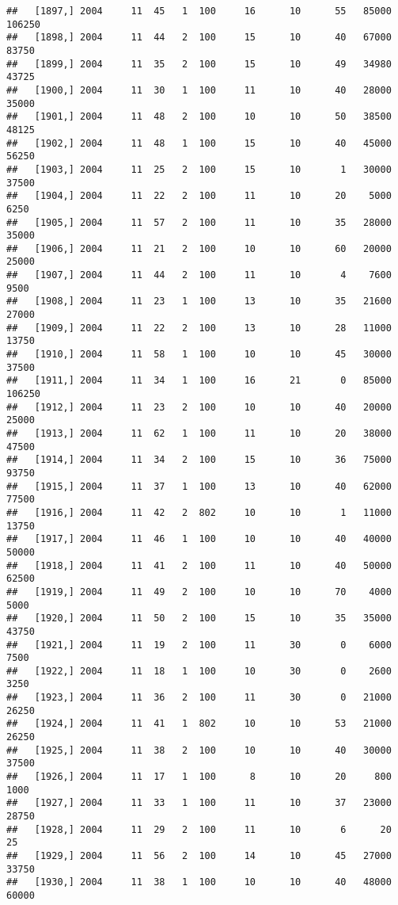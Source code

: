 \documentclass{article}\usepackage[]{graphicx}\usepackage[]{color}
\makeatletter
\newenvironment{kframe}{%
 \def\at@end@of@kframe{}%
 \ifinner\ifhmode%
  \def\at@end@of@kframe{\end{minipage}}%
  \begin{minipage}{\columnwidth}%
 \fi\fi%
 \def\FrameCommand##1{\hskip\@totalleftmargin \hskip-\fboxsep
 \colorbox{shadecolor}{##1}\hskip-\fboxsep
     \hskip-\linewidth \hskip-\@totalleftmargin \hskip\columnwidth}%
 \MakeFramed {\advance\hsize-\width
   \@totalleftmargin\z@ \linewidth\hsize
   \@setminipage}}%
 {\par\unskip\endMakeFramed%
 \at@end@of@kframe}
\newenvironment{knitrout}{}{} %
\makeatother
\begin{document}
\begin{knitrout}
\begin{kframe}
\begin{verbatim}
##   [1897,] 2004     11  45   1  100     16      10      55   85000  106250
##   [1898,] 2004     11  44   2  100     15      10      40   67000   83750
##   [1899,] 2004     11  35   2  100     15      10      49   34980   43725
##   [1900,] 2004     11  30   1  100     11      10      40   28000   35000
##   [1901,] 2004     11  48   2  100     10      10      50   38500   48125
##   [1902,] 2004     11  48   1  100     15      10      40   45000   56250
##   [1903,] 2004     11  25   2  100     15      10       1   30000   37500
##   [1904,] 2004     11  22   2  100     11      10      20    5000    6250
##   [1905,] 2004     11  57   2  100     11      10      35   28000   35000
##   [1906,] 2004     11  21   2  100     10      10      60   20000   25000
##   [1907,] 2004     11  44   2  100     11      10       4    7600    9500
##   [1908,] 2004     11  23   1  100     13      10      35   21600   27000
##   [1909,] 2004     11  22   2  100     13      10      28   11000   13750
##   [1910,] 2004     11  58   1  100     10      10      45   30000   37500
##   [1911,] 2004     11  34   1  100     16      21       0   85000  106250
##   [1912,] 2004     11  23   2  100     10      10      40   20000   25000
##   [1913,] 2004     11  62   1  100     11      10      20   38000   47500
##   [1914,] 2004     11  34   2  100     15      10      36   75000   93750
##   [1915,] 2004     11  37   1  100     13      10      40   62000   77500
##   [1916,] 2004     11  42   2  802     10      10       1   11000   13750
##   [1917,] 2004     11  46   1  100     10      10      40   40000   50000
##   [1918,] 2004     11  41   2  100     11      10      40   50000   62500
##   [1919,] 2004     11  49   2  100     10      10      70    4000    5000
##   [1920,] 2004     11  50   2  100     15      10      35   35000   43750
##   [1921,] 2004     11  19   2  100     11      30       0    6000    7500
##   [1922,] 2004     11  18   1  100     10      30       0    2600    3250
##   [1923,] 2004     11  36   2  100     11      30       0   21000   26250
##   [1924,] 2004     11  41   1  802     10      10      53   21000   26250
##   [1925,] 2004     11  38   2  100     10      10      40   30000   37500
##   [1926,] 2004     11  17   1  100      8      10      20     800    1000
##   [1927,] 2004     11  33   1  100     11      10      37   23000   28750
##   [1928,] 2004     11  29   2  100     11      10       6      20      25
##   [1929,] 2004     11  56   2  100     14      10      45   27000   33750
##   [1930,] 2004     11  38   1  100     10      10      40   48000   60000

\end{verbatim}
\end{kframe}
\end{knitrout}
\end{document}
